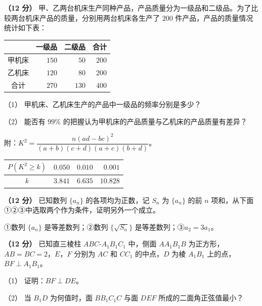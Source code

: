 \begin{question}
\textbf{（12 分）} 甲、乙两台机床生产同种产品，产品质量分为一级品和二级品。为了比较两台机床产品的质量，分别用两台机床各生产了 $200$ 件产品，产品的质量情况统计如下表：

\begin{center}
\begin{tabular}{crrr}
\toprule
 & 一级品 & 二级品 & 合计 \\
\midrule
甲机床 & $150$ & $50$ & $200$ \\
乙机床 & $120$ & $80$ & $200$ \\
合计 & $270$ & $130$ & $400$ \\
\bottomrule
\end{tabular}
\end{center}

（1） 甲机床、乙机床生产的产品中一级品的频率分别是多少？

（2） 能否有 $99\%$ 的把握认为甲机床的产品质量与乙机床的产品质量有差异？

附：$K^2=\dfrac{n(ad-bc)^2}{(a+b)(c+d)(a+c)(b+d)}$。

\begin{center}
\begin{tabular}{crrr}
\toprule
$P(K^2\geqslant k)$ & $0.050$ & $0.010$ & $0.001$ \\
\midrule
$k$ & $3.841$ & $6.635$ & $10.828$ \\
\bottomrule
\end{tabular}
\end{center}

\end{question}
\begin{question}
\textbf{（12 分）} 已知数列 $\{a_n\}$ 的各项均为正数，记 $S_n$ 为 $\{a_n\}$ 的前 $n$ 项和，从下面①②③中选取两个作为条件，证明另外一个成立。

①数列 $\{a_n\}$ 是等差数列；②数列 $\{\sqrt{S_n}\}$ 是等差数列；③$a_2=3a_1$。

\Needspace{0.4\textheight}
\end{question}
\begin{question}
\textbf{（12 分）} 已知直三棱柱 $ABC\text{-}A_1B_1C_1$ 中，侧面 $AA_1B_1B$ 为正方形，$AB=BC=2$，$E$，$F$ 分别为 $AC$ 和 $CC_1$ 的中点，$D$ 为棱 $A_1B_1$ 上的点，$BF\perp A_1B_1$。
\nopagebreak[4]
\begin{center}\end{center}
\nopagebreak[4]
（1） 证明：$BF\perp DE$。

（2） 当 $B_1D$ 为何值时，面 $BB_1C_1C$ 与面 $DEF$ 所成的二面角正弦值最小？

\end{question}
